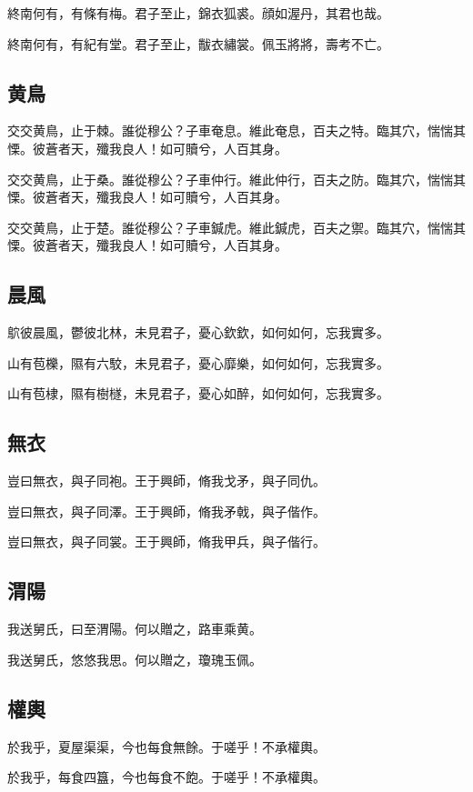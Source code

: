 終南何有，有條有梅。君子至止，錦衣狐裘。顔如渥丹，其君也哉。

終南何有，有紀有堂。君子至止，黻衣繡裳。佩玉將將，壽考不亡。

\subsection[黄鳥]{黄鳥}

交交黄鳥，止于棘。誰從穆公？子車奄息。維此奄息，百夫之特。臨其穴，惴惴其慄。彼蒼者天，殲我良人！如可贖兮，人百其身。

交交黄鳥，止于桑。誰從穆公？子車仲行。維此仲行，百夫之防。臨其穴，惴惴其慄。彼蒼者天，殲我良人！如可贖兮，人百其身。

交交黄鳥，止于楚。誰從穆公？子車鍼虎。維此鍼虎，百夫之禦。臨其穴，惴惴其慄。彼蒼者天，殲我良人！如可贖兮，人百其身。

\subsection[晨風]{晨風}

鴥彼晨風，鬱彼北林，未見君子，憂心欽欽，如何如何，忘我實多。

山有苞櫟，隰有六駮，未見君子，憂心靡樂，如何如何，忘我實多。

山有苞棣，隰有樹檖，未見君子，憂心如醉，如何如何，忘我實多。

\subsection[無衣]{無衣}

豈曰無衣，與子同袍。王于興師，脩我戈矛，與子同仇。

豈曰無衣，與子同澤。王于興師，脩我矛戟，與子偕作。

豈曰無衣，與子同裳。王于興師，脩我甲兵，與子偕行。

\subsection[渭陽]{渭陽}

我送舅氏，曰至渭陽。何以贈之，路車乘黄。

我送舅氏，悠悠我思。何以贈之，瓊瑰玉佩。

\subsection[權輿]{權輿}

於我乎，夏屋渠渠，今也每食無餘。于嗟乎！不承權輿。

於我乎，每食四簋，今也每食不飽。于嗟乎！不承權輿。
